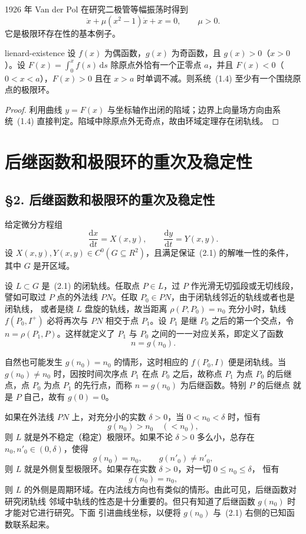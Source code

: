 
1926 年 Van der Pol 在研究二极管等幅振荡时得到
\[
  \ddot{x}+\mu(x^2-1)\dot{x}+x=0,\qquad \mu>0. \tag{1.5}
\]
它是极限环存在性的基本例子。

\begin{theorem}{}{lienard-existence}
设 $f(x)$ 为偶函数，$g(x)$ 为奇函数，且 $g(x)>0$（$x>0$）。设
$F(x)=\int_0^xf(s)\,\mathrm{d}s$ 除原点外恰有一个正零点 $a$，并且
$F(x)<0$（$0<x<a$），$F(x)>0$ 且在 $x>a$ 时单调不减。则系统~(1.4)
至少有一个围绕原点的极限环。
\end{theorem}

\begin{proof}
利用曲线 $y=F(x)$ 与坐标轴作出闭的陷域；边界上向量场方向由系统~(1.4)
直接判定。陷域中除原点外无奇点，故由环域定理存在闭轨线。
\end{proof}

\fi

\section{后继函数和极限环的重次及稳定性}

\subsection*{\S 2. 后继函数和极限环的重次及稳定性}

给定微分方程组
\[
  \dfrac{\mathrm{d}x}{\mathrm{d}t}=X(x,y),\qquad
  \dfrac{\mathrm{d}y}{\mathrm{d}t}=Y(x,y). \tag{2.1}
\]
设 $X(x,y),Y(x,y)\in C^0(G\subseteq R^2)$，且满足保证~(2.1) 的解唯一性的条件，
其中 $G$ 是开区域。

设 $L\subset G$ 是~(2.1) 的闭轨线。任取点 $P\in L$，过 $P$ 作光滑无切弧段或无切线段，
譬如可取过 $P$ 点的外法线 $PN$。任取 $P_0\in PN$，由于闭轨线邻近的轨线或者也是闭轨线，
或者是绕 $L$ 盘旋的轨线，故当距离 $\rho(P,P_0)=n_0$ 充分小时，轨线 $f(P_0,I^+)$
必将再次与 $PN$ 相交于点 $P_1$。设 $P_1$ 是继 $P_0$ 之后的第一个交点，令
$n=\rho(P_1,P)$。这样就定义了 $P_1$ 与 $P_0$ 之间的一一对应关系，即定义了函数
\[
  n=g(n_0).
\]


自然也可能发生 $g(n_0)=n_0$ 的情形，这时相应的 $f(P_0,I)$ 便是闭轨线。当
$g(n_0)\ne n_0$ 时，因按时间次序点 $P_1$ 在点 $P_0$ 之后，故称点 $P_1$ 为点 $P_0$
的后继点，点 $P_0$ 为点 $P_1$ 的先行点，而称 $n=g(n_0)$ 为后继函数。特别 $P$ 的后继点
就是 $P$ 自己，故有 $g(0)=0$。

如果在外法线 $PN$ 上，对充分小的实数 $\delta>0$，当 $0<n_0<\delta$ 时，恒有
\[
  g(n_0)>n_0\quad(<n_0),
\]
则 $L$ 就是外不稳定（稳定）极限环。如果不论 $\delta>0$ 多么小，总存在
$n_0,n'_0\in(0,\delta)$，使得
\[
  g(n_0)=n_0,\qquad g(n'_0)\ne n'_0,
\]
则 $L$ 就是外侧复型极限环。如果存在实数 $\delta>0$，对一切 $0\leq n_0\leq\delta$，
恒有
\[
  g(n_0)=n_0,
\]
则 $L$ 的外侧是周期环域。在内法线方向也有类似的情形。由此可见，后继函数对研究闭轨线
邻域中轨线的性态是十分重要的。但只有知道了后继函数 $g(n_0)$ 时才能对它进行研究。下面
引进曲线坐标，以便将 $g(n_0)$ 与~(2.1) 右侧的已知函数联系起来。

